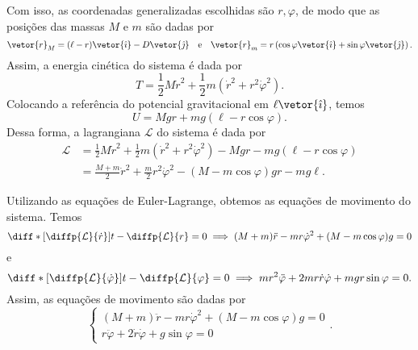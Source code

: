 Com isso, as coordenadas generalizadas escolhidas são \(r, \varphi\), de modo que as posições das massas \(M\) e \(m\) são dadas por
\begin{equation*}
    \vetor{r}_M = (\ell - r)\vetor{\hat\imath}-D \vetor{\hat\jmath}\quad\text{e}\quad\vetor{r}_m = r\left(\cos\varphi \vetor{\hat\imath} + \sin\varphi \vetor{\hat\jmath}\right).
\end{equation*}
Assim, a energia cinética do sistema é dada por
\begin{equation*}
    T = \frac12 M\dot{r}^2 + \frac12m \left(\dot{r}^2 + r^2\dot\varphi^2\right).
\end{equation*}
Colocando a referência do potencial gravitacional em \(\ell \vetor{\hat\imath}\), temos
\begin{equation*}
    U = Mgr + mg\left(\ell - r\cos\varphi\right).
\end{equation*}
Dessa forma, a lagrangiana \(\mathcal{L}\) do sistema é dada por
\begin{align*}
    \mathcal{L} &= \frac12 M\dot{r}^2 + \frac12m \left(\dot{r}^2 + r^2\dot\varphi^2\right) - Mgr - mg\left(\ell - r\cos\varphi\right)\\
                &= \frac{M+m}{2}\dot{r}^2 + \frac{m}{2}r^2\dot\varphi^2 - (M - m\cos\varphi)gr - mg\ell.
\end{align*}

Utilizando as equações de Euler-Lagrange, obtemos as equações de movimento do sistema. Temos
\begin{equation*}
    \diff*{{\left[\diffp{\mathcal{L}}{\dot{r}}\right]}}{t} - \diffp{\mathcal{L}}{r} = 0 \implies (M+m)\ddot{r} - mr\dot\varphi^2 + (M - m\cos\varphi)g = 0
\end{equation*}
e
\begin{equation*}
    \diff*{{\left[\diffp{\mathcal{L}}{\dot{\varphi}}\right]}}{t} - \diffp{\mathcal{L}}{\varphi} = 0 \implies mr^2\ddot\varphi + 2mr\dot{r}\dot\varphi + mgr\sin\varphi = 0.
\end{equation*}
Assim, as equações de movimento são dadas por
\begin{equation*}
    \begin{cases}
            (M+m)\ddot{r} - mr\dot\varphi^2 + (M - m\cos\varphi)g = 0\\
            r\ddot\varphi + 2\dot{r}\dot\varphi + g\sin\varphi = 0
    \end{cases}.
\end{equation*}
